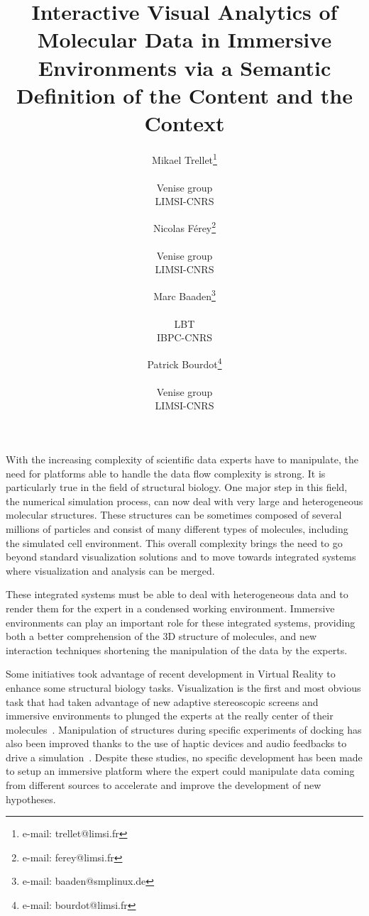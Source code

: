 \documentclass{vgtc}                          %
\title{Interactive Visual Analytics of Molecular Data in Immersive Environments via a Semantic Definition of the Content and the Context}
\author{Mikael Trellet\thanks{e-mail: trellet@limsi.fr}\\ %
      \parbox{1.4in}{\scriptsize \centering Venise group \\ LIMSI-CNRS }%
\and Nicolas Férey\thanks{e-mail: ferey@limsi.fr}\\ %
     \parbox{1.4in}{\scriptsize \centering Venise group \\ LIMSI-CNRS }%
\and Marc Baaden\thanks{e-mail: baaden@smplinux.de}\\ %
     \parbox{1.4in}{\scriptsize \centering LBT \\ IBPC-CNRS}
\and Patrick Bourdot\thanks{e-mail: bourdot@limsi.fr}\\ %
     \parbox{1.4in}{\scriptsize \centering Venise group \\ LIMSI-CNRS }}%
\begin{document}


\maketitle



With the increasing complexity of scientific data experts have to manipulate, the need for platforms able to handle the data flow complexity is strong. It is particularly true in the field of structural biology. One major step in this field, the numerical simulation process, can now deal with very large and heterogeneous molecular structures. These structures can be sometimes composed of several millions of particles and consist of many different types of molecules, including the simulated cell environment. This overall complexity brings the need to go beyond standard visualization solutions and to move towards integrated systems where visualization and analysis can be merged. 

These integrated systems must be able to deal with heterogeneous data and to render them for the expert in a condensed working environment.
Immersive environments can play an important role for these integrated systems, providing both a better comprehension of the 3D structure of molecules, and new interaction techniques shortening the manipulation of the data by the experts.

Some initiatives took advantage of recent development in Virtual Reality to enhance some structural biology tasks. Visualization is the first and most obvious task that had taken advantage of new adaptive stereoscopic screens and immersive environments to plunged the experts at the really center of their molecules~\cite{van2000immersive,stone_immersive_2010,odonoghue_visualization_2010,hirst2014molecular}. Manipulation of structures during specific experiments of docking has also been improved thanks to the use of haptic devices and audio feedbacks to drive a simulation~\cite{ferey_multisensory_2009}. Despite these studies, no specific development has been made to setup an immersive platform where the expert could manipulate data coming from different sources to accelerate and improve the development of new hypotheses.
\end{document}
